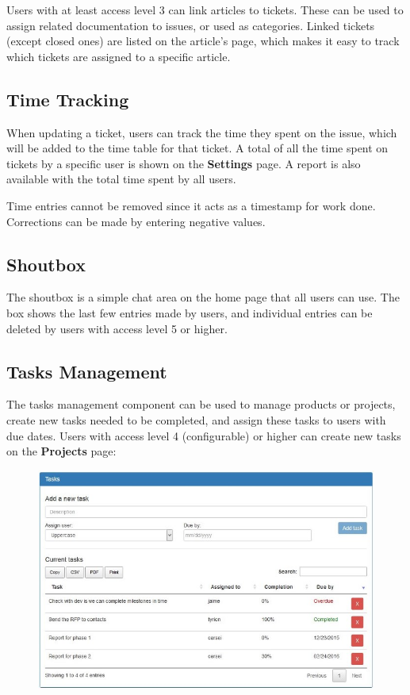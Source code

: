 \documentclass[11pt]{article}
\begin{document}
Users with at least access level 3 can link articles to tickets. These can be used to assign related documentation to issues, or used as categories. Linked tickets (except closed ones) are listed on the article's page, which makes it easy to track which tickets are assigned to a specific article.

\subsection{Time Tracking}
When updating a ticket, users can track the time they spent on the issue, which will be added to the time table for that ticket. A total of all the time spent on tickets by a specific user is shown on the \textbf{Settings} page. A report is also available with the total time spent by all users.

Time entries cannot be removed since it acts as a timestamp for work done. Corrections can be made by entering negative values.

\subsection{Shoutbox}
The shoutbox is a simple chat area on the home page that all users can use. The box shows the last few entries made by users, and individual entries can be deleted by users with access level 5 or higher.

\subsection{Tasks Management}
The tasks management component can be used to manage products or projects, create new tasks needed to be completed, and assign these tasks to users with due dates. Users with access level 4 (configurable) or higher can create new tasks on the \textbf{Projects} page:

\begin{figure}[h]
\includegraphics{projectmanagement.jpg}
\end{figure}
\end{document}
